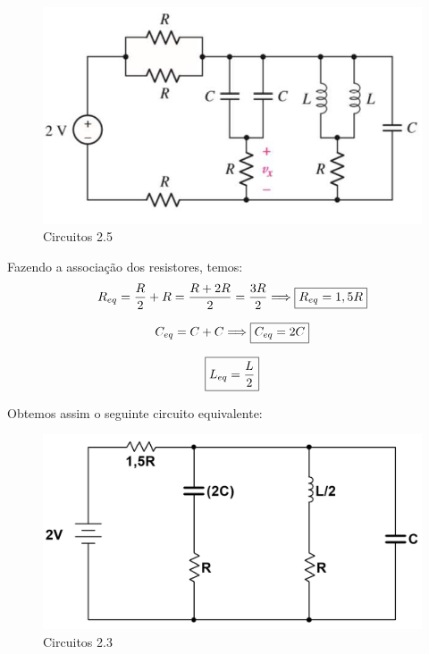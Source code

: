 \documentclass[
	12pt,				%
	oneside,			%
	a4paper,			%
	english,			%
	french,				%
	spanish,			%
	brazil				%
	]{abntex2}
\begin{document}
\begin{figure}[htb]
	\centering
	\includegraphics[scale=0.5]{2-5.PNG}
	\caption{Circuitos 2.5}
\end{figure}

Fazendo a associação dos resistores, temos:
\begin{equation}
    R_{eq} = \dfrac{R}{2} + R = \dfrac{R+2R}{2} = \dfrac{3R}{2} \Longrightarrow \fbox{$R_{eq} = 1,5R$}
\end{equation}

\begin{equation}
    C_{eq} = C+C \Longrightarrow \fbox{$C_{eq} = 2C$}
\end{equation}

\begin{equation}
    \fbox{$L_{eq} = \dfrac{L}{2}$}
\end{equation}

Obtemos assim o seguinte circuito equivalente:
\begin{figure}[htb]
	\centering
	\includegraphics[scale=0.25]{Circuito_2-5.PNG}
	\caption{Circuitos 2.3}
\end{figure}
\end{document}
